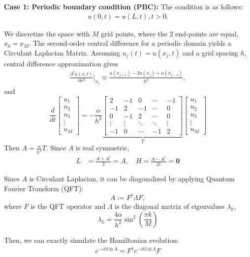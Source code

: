 \documentclass{article}
\begin{document}
\textbf{Case 1: Periodic boundary condition (PBC):}
The condition is as follows:
\begin{align*}
    u(0,t) = u(L,t), t>0.
\end{align*}

We discretize the space with $M$ grid points, where the 2 end-points are equal, $x_0=x_M$. The second-order central difference for a periodic domain yields a Circulant Laplacian Matrix. Assuming $u_j(t) = u(x_j, t)$ and a grid spacing $h$, central difference approximation gives
\begin{align*}
    \frac{\partial^2 u(x,t)}{\partial x^2} \bigg\rvert_{x_j} \approx \frac{u(x_{j+1})-2u(x_{j}) + u(x_{j-1})}{h^2},
\end{align*}
and
$$\frac{d}{dt}
\begin{bmatrix}
u_1 \\ u_2 \\ u_3 \\ \vdots \\ u_M
\end{bmatrix}
= -\frac{\alpha}{h^2} 
\underbrace{
\begin{bmatrix}
 2 & -1 &  0 & \cdots & -1 \\
-1 &  2 & -1 & \cdots &  0 \\
 0 & -1 &  2 & \cdots &  0 \\
\vdots & \vdots & \ddots & \ddots & \vdots \\
-1 &  0 & \cdots & -1 &  2
\end{bmatrix}}_{T}
\begin{bmatrix}
u_1 \\ u_2 \\ u_3 \\ \vdots \\ u_M
\end{bmatrix}$$
Then $A = \frac{\alpha}{h^2} T$. Since $A$ is real symmetric,
\begin{align}
    L &= \frac{A+A^\dagger}{2} = A,\quad    H = \frac{A-A^\dagger}{2i} =  \mathbf{0}
\end{align}

Since $A$ is Circulant Laplacian, it can be diagonalized by applying Quantum Fourier Transform (QFT):
$$A:=F^\dagger \Lambda F,$$
where $F$ is the QFT operator and $\Lambda$ is the diagonal matrix of eigenvalues $\lambda_k$,
$$\lambda_k = \frac{4\alpha}{h^2} \sin^2\left(\frac{\pi k}{M}\right)$$

Then, we can exactly simulate the Hamiltonian evolution:
\begin{align}
    e^{-it\hat x \otimes A}=F^\dagger e^{-it \hat x \otimes \Lambda} F
\end{align}
\end{document}

